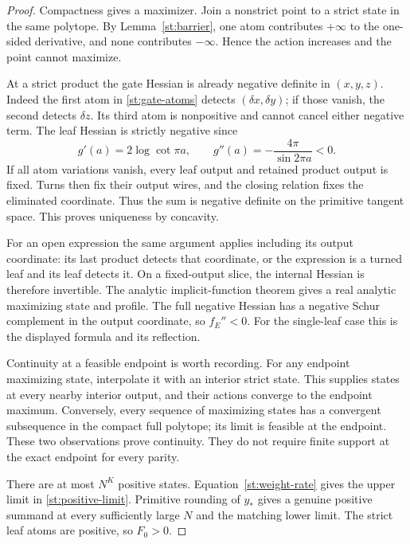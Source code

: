 \begin{proof}
Compactness gives a maximizer. Join a nonstrict point
to a strict state in the same polytope. By
Lemma~\ref{st:barrier}, one atom contributes $+\infty$
to the one-sided derivative, and none contributes
$-\infty$. Hence the action increases and the point
cannot maximize.

At a strict product the gate Hessian is already
negative definite in $(x,y,z)$. Indeed the first
atom in \eqref{st:gate-atoms} detects
$(\delta x,\delta y)$; if those vanish, the second
detects $\delta z$. Its third atom is nonpositive
and cannot cancel either negative term.
The leaf Hessian is strictly negative since
\[
 g'(a)=2\log\cot\pi a,\qquad
 g''(a)=-\frac{4\pi}{\sin2\pi a}<0 .
\]
If all atom variations vanish, every leaf output
and retained product output is fixed. Turns then
fix their output wires, and the closing relation
fixes the eliminated coordinate. Thus the sum is
negative definite on the primitive tangent space.
This proves uniqueness by concavity.

For an open expression the same argument applies
including its output coordinate: its last product
detects that coordinate, or the expression is a
turned leaf and its leaf detects it. On a fixed-output
slice, the internal Hessian is therefore invertible.
The analytic implicit-function theorem gives a
real analytic maximizing state and profile.
The full negative Hessian has a negative Schur
complement in the output coordinate, so $f_E''<0$.
For the single-leaf case this is the displayed
formula and its reflection.

Continuity at a feasible endpoint is worth recording.
For any endpoint maximizing state, interpolate it
with an interior strict state. This supplies states
at every nearby interior output, and their actions
converge to the endpoint maximum. Conversely, every
sequence of maximizing states has a convergent
subsequence in the compact full polytope; its limit
is feasible at the endpoint. These two observations
prove continuity. They do not require finite support
at the exact endpoint for every parity.

There are at most $N^K$ positive states.
Equation~\eqref{st:weight-rate} gives the upper
limit in \eqref{st:positive-limit}. Primitive
rounding of $y_*$ gives a genuine positive summand
at every sufficiently large $N$ and the matching
lower limit. The strict leaf atoms are positive,
so $F_0>0$.
\end{proof}

